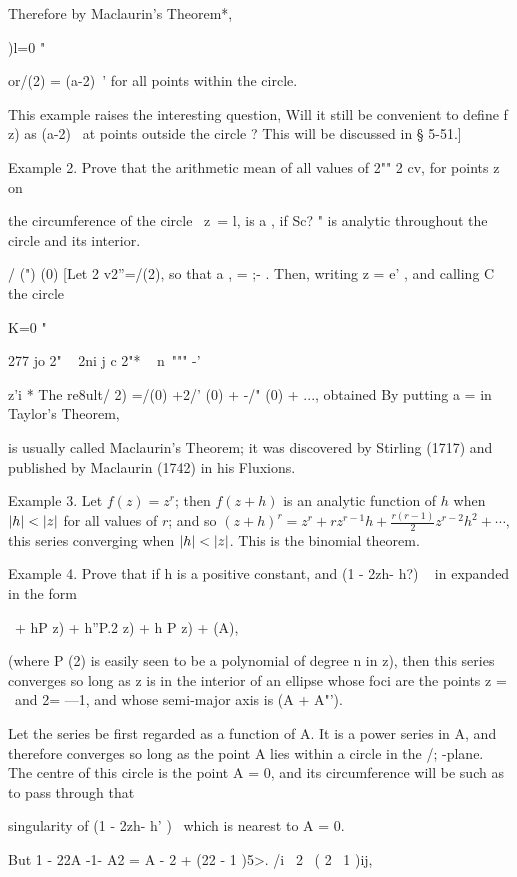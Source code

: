 {{Therefore by Maclaurin's Theorem*,

)l=0 "

or/(2) = (a-2)~' for all points within the circle.

This example raises the interesting question, Will it still be
convenient to define f z) as (a-2)~ at points outside the circle ?
This will be discussed in § 5-51.]

Example 2. Prove that the arithmetic mean of all values of 2"" 2 cv,
for points z on

the circumference of the circle \ z\ = l, is a , if Sc? " is analytic
throughout the circle and its interior.

/ (") (0) [Let 2 v2''=/(2), so that a , = ;- . Then, writing z = e' ,
and calling C the circle

K=0 "

277 jo 2" ~ 2ni j c 2"* ~ n\ """ -'

z'i * The re8ult/ 2) =/(0) +2/' (0) + -/" (0) + ..., obtained By
putting a = in Taylor's Theorem,

is usually called Maclaurin's Theorem; it was discovered by Stirling
(1717) and published by Maclaurin (1742) in his Fluxions.


%
%

Example 3. Let $f(z) = z^{r}$; then $f(z+h)$ is an analytic function
of $h$ when $\left| h \right| < \left| z \right|$ for all values of $r$; and so
$(z + h)^{r} = z^{r} + rz^{r-1} h + \frac{ r (r-1) }{2} z^{r-2} h^{2}
+ \cdots, $ this series converging when $\left| h \right| < \left| z \right|$.
This is the binomial theorem.

Example 4. Prove that if h is a positive constant, and (1 - 2zh- h?) ~
in expanded in the form

\ + hP z) + h''P.2 z) + h P z) + (A),

(where P (2) is easily seen to be a polynomial of degree n in z), then
this series converges so long as z is in the interior of an ellipse
whose foci are the points z = \ and 2= —1, and whose semi-major axis
is (A + A"').

Let the series be first regarded as a function of A. It is a power
series in A, and therefore converges so long as the point A lies
within a circle in the /; -plane. The centre of this circle is the
point A = 0, and its circumference will be such as to pass through
that

singularity of (1 - 2zh- h' )~ which is nearest to A = 0.

But 1 - 22A -1- A2 = A - 2 + (22 - 1 )5>. /i \ 2 \ ( 2 \ 1 )ij,

}}
